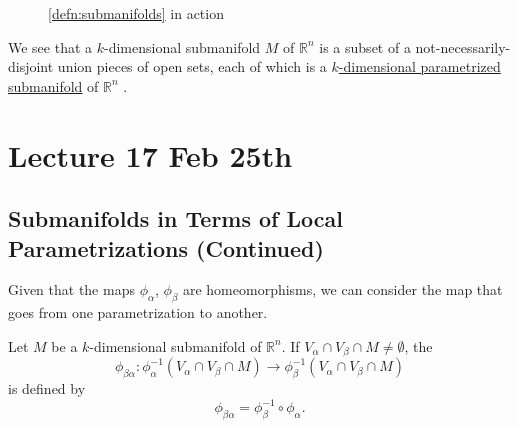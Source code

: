 \documentclass[notoc,notitlepage]{tufte-book}
\begin{document}
\begin{defn}[Submanifolds]
\begin{figure*}[ht]
    \caption{\cref{defn:submanifolds} in action}\label{fig:defn_submanifolds}
  \end{figure*}
\end{defn}

\begin{note}
  We see that a $k$-dimensional submanifold $M$ of $\mathbb{R}^n$ is a subset of
  a not-necessarily-disjoint union pieces of open sets, each of which is a
  \hyperref[defn:parametrizations_and_parametrized_submanifolds]{$k$-dimensional
  parametrized submanifold} of $\mathbb{R}^n$ .
\end{note}



\chapter{Lecture 17 Feb 25th}%
\label{chp:lecture_17_feb_25th}

\section{Submanifolds in Terms of Local Parametrizations (Continued)}%
\label{sec:submanifolds_in_terms_of_local_parametrizations_continued}

Given that the maps $\phi_\alpha$, $\phi_\beta$ are homeomorphisms, we can
consider the map that goes from one parametrization to another.

\begin{defn}\label{defn:transition_map}
  Let $M$ be a $k$-dimensional submanifold of $\mathbb{R}^n$. If $V_\alpha \cap
  V_\beta \cap M \neq \emptyset$, the 
  \begin{equation*}
    \phi_{\beta \alpha} : \phi_{\alpha}^{-1} (V_\alpha \cap V_\beta \cap M) \to
    \phi_{\beta}^{-1} (V_\alpha \cap V_\beta \cap M)
  \end{equation*}
  is defined by
  \begin{equation*}
    \phi_{\beta \alpha} = \phi_{\beta}^{-1} \circ \phi_\alpha.
  \end{equation*}
\end{defn}
\end{document}
